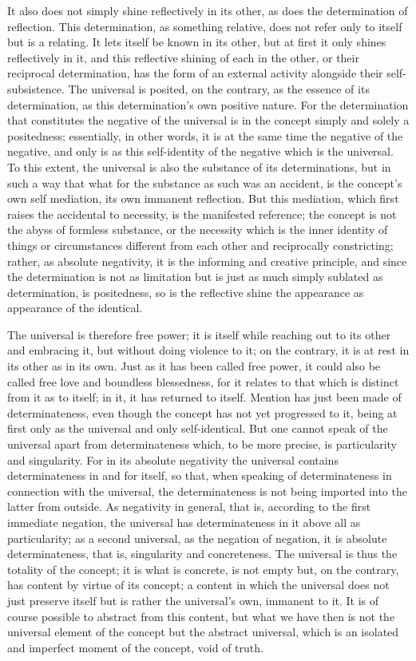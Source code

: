 It also does not simply shine reflectively in its other,
as does the determination of reflection.
This determination, as something relative,
does not refer only to itself but is a relating.
It lets itself be known in its other,
but at first it only shines reflectively in it,
and this reflective shining of each in the other,
or their reciprocal determination,
has the form of an external activity
alongside their self-subsistence.
The universal is posited, on the contrary,
as the essence of its determination,
as this determination's own positive nature.
For the determination that constitutes the negative of the
universal is in the concept simply and solely a positedness;
essentially, in other words,
it is at the same time the negative of the negative,
and only is as this self-identity of the negative
which is the universal.
To this extent, the universal is also
the substance of its determinations,
but in such a way that
what for the substance as such was an accident,
is the concept's own self mediation,
its own immanent reflection.
But this mediation,
which first raises the accidental to necessity,
is the manifested reference;
the concept is not the abyss of formless substance,
or the necessity which is the inner identity of things
or circumstances different from each other
and reciprocally constricting;
rather, as absolute negativity,
it is the informing and creative principle,
and since the determination is not as limitation
but is just as much simply sublated as determination,
is positedness, so is the reflective shine
the appearance as appearance of the identical.

The universal is therefore free power;
it is itself while reaching out
to its other and embracing it,
but without doing violence to it;
on the contrary, it is at rest
in its other as in its own.
Just as it has been called free power,
it could also be called free love
and boundless blessedness,
for it relates to that
which is distinct from it as to itself;
in it, it has returned to itself.
Mention has just been made of determinateness,
even though the concept has not yet progressed to it,
being at first only as the universal
and only self-identical.
But one cannot speak of the universal
apart from determinateness
which, to be more precise,
is particularity and singularity.
For in its absolute negativity
the universal contains determinateness
in and for itself, so that,
when speaking of determinateness
in connection with the universal,
the determinateness is not being
imported into the latter from outside.
As negativity in general, that is,
according to the first immediate negation,
the universal has determinateness in it
above all as particularity;
as a second universal, as the negation of negation,
it is absolute determinateness, that is,
singularity and concreteness.
The universal is thus the totality of the concept;
it is what is concrete, is not empty
but, on the contrary, has content
by virtue of its concept;
a content in which the universal
does not just preserve itself
but is rather the universal's own,
immanent to it.
It is of course possible to abstract from this content,
but what we have then is not
the universal element of the concept
but the abstract universal,
which is an isolated and imperfect
moment of the concept, void of truth.

